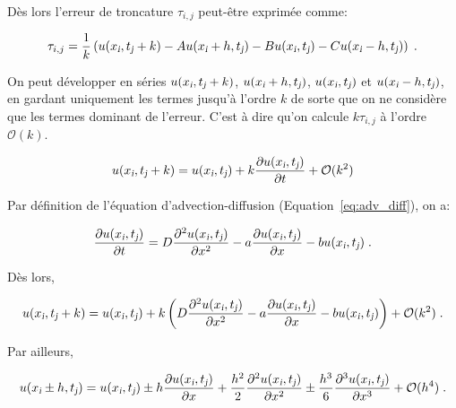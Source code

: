 \documentclass[a4paper, 12pt]{report}
\begin{document}
Dès lors l'erreur de troncature $\tau_{i,j}$ peut-être exprimée comme:

\begin{equation}
\tau_{i,j} = \frac{1}{k} \left (u(x_{\textsl{i}},t_{\textsl{j}}+k) - A u(x_{\textsl{i}}+h, t_{\textsl{j}}) - B u(x_{\textsl{i}}, t_{\textsl{j}}) - C u(x_{\textsl{i}}-h, t_{\textsl{j}})  \right ) \;.
\label{eq:erreur_troncature}
\end{equation}

On peut développer en séries $u(x_{\textsl{i}},t_{\textsl{j}}+k)$, $u(x_{\textsl{i}}+h, t_{\textsl{j}})$, $u(x_{\textsl{i}}, t_{\textsl{j}})$ et $u(x_{\textsl{i}}-h, t_{\textsl{j}})$,
en gardant uniquement les termes jusqu'à l'ordre $k$ de sorte que on ne considère que
les termes dominant de l'erreur. C'est à dire qu'on calcule $k\tau_{i,j}$ à l'ordre $\mathcal{O}(k)$.

\begin{equation}
  u(x_{\textsl{i}},t_{\textsl{j}}+k) = u(x_{\textsl{i}},t_{\textsl{j}}) + k \frac{\partial u(x_{\textsl{i}},t_{\textsl{j}})}{\partial t} + \mathcal{O}(k^2)
\end{equation}

Par définition de l'équation d'advection-diffusion (Equation~\ref{eq:adv_diff}),
on a:

\begin{equation}
  \frac{\partial u(x_{\textsl{i}},t_{\textsl{j}})}{\partial t} = D \frac{\partial^2 u(x_{\textsl{i}},t_{\textsl{j}})}{\partial x^2} - a \frac{\partial u(x_{\textsl{i}},t_{\textsl{j}})}{\partial x} - b u(x_{\textsl{i}},t_{\textsl{j}}) \;.
  \label{eq:adv_isole_der_par_rap_temps}
\end{equation}

Dès lors,

\begin{equation}
  u(x_{\textsl{i}},t_{\textsl{j}}+k) = u(x_{\textsl{i}},t_{\textsl{j}}) + k \left ( D \frac{\partial^2 u(x_{\textsl{i}},t_{\textsl{j}})}{\partial x^2} - a \frac{\partial u(x_{\textsl{i}},t_{\textsl{j}})}{\partial x} - b u(x_{\textsl{i}},t_{\textsl{j}}) \right ) + \mathcal{O}(k^2)\;.
  \label{eq:taylor_u_t_k}
\end{equation}

Par ailleurs,

\begin{equation}
  u(x_{\textsl{i}} \pm h,t_{\textsl{j}}) = u(x_{\textsl{i}},t_{\textsl{j}}) \pm h \frac{\partial u(x_{\textsl{i}},t_{\textsl{j}})}{\partial x} + \frac{h^2}{2} \frac{\partial^2 u(x_{\textsl{i}},t_{\textsl{j}})}{\partial x^2} \pm \frac{h^3}{6} \frac{\partial^3 u(x_{\textsl{i}},t_{\textsl{j}})}{\partial x^3} + \mathcal{O}(h^4)\;.
  \label{eq:taylor_u_x_h}
\end{equation}
\end{document}
